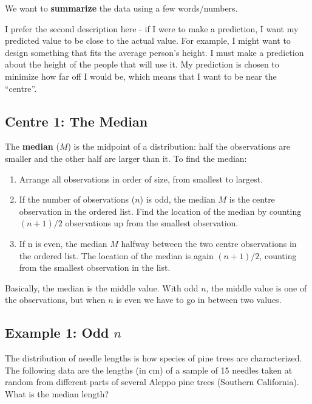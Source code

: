 \documentclass[
  letterpaper,
  DIV=11,
  numbers=noendperiod]{scrreprt}
\providecommand{\tightlist}{%
  \setlength{\itemsep}{0pt}\setlength{\parskip}{0pt}}\usepackage{longtable,booktabs,array}
\begin{document}
We want to \textbf{summarize} the data using a few words/numbers.

I prefer the second description here - if I were to make a prediction, I
want my predicted value to be close to the actual value. For example, I
might want to design something that fits the average person's height. I
must make a prediction about the height of the people that will use it.
My prediction is chosen to minimize how far off I would be, which means
that I want to be near the ``centre''.

\hypertarget{centre-1-the-median}{%
\subsection{Centre 1: The Median}\label{centre-1-the-median}}

The \textbf{median} (\(M\)) is the midpoint of a distribution: half the
observations are smaller and the other half are larger than it. To find
the median:

\begin{enumerate}
\def\labelenumi{\arabic{enumi}.}
\tightlist
\item
  Arrange all observations in order of size, from smallest to largest.
\item
  If the number of observations (\(n\)) is odd, the median \(M\) is the
  centre observation in the ordered list. Find the location of the
  median by counting \((n + 1)/2\) observations up from the smallest
  observation.
\item
  If n is even, the median \(M\) halfway between the two centre
  observations in the ordered list. The location of the median is again
  \((n + 1)/2\), counting from the smallest observation in the list.
\end{enumerate}

Basically, the median is the middle value. With odd \(n\), the middle
value is one of the observations, but when \(n\) is even we have to go
in between two values.

\hypertarget{example-1-odd-n}{%
\subsection{\texorpdfstring{Example 1: Odd
\(n\)}{Example 1: Odd n}}\label{example-1-odd-n}}

The distribution of needle lengths is how species of pine trees are
characterized. The following data are the lengths (in cm) of a sample of
15 needles taken at random from different parts of several Aleppo pine
trees (Southern California). What is the median length?
\end{document}
